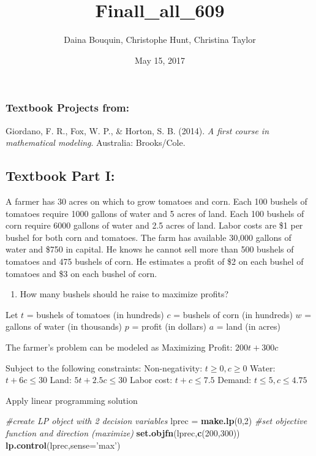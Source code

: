 \documentclass[]{article}
\title{Finall\_all\_609}
\author{Daina Bouquin, Christophe Hunt, Christina Taylor}
\date{May 15, 2017}
\newenvironment{Shaded}{\begin{snugshade}}{\end{snugshade}}
\newcommand{\KeywordTok}[1]{\textcolor[rgb]{0.13,0.29,0.53}{\textbf{#1}}}
\newcommand{\DataTypeTok}[1]{\textcolor[rgb]{0.13,0.29,0.53}{#1}}
\newcommand{\DecValTok}[1]{\textcolor[rgb]{0.00,0.00,0.81}{#1}}
\newcommand{\StringTok}[1]{\textcolor[rgb]{0.31,0.60,0.02}{#1}}
\newcommand{\CommentTok}[1]{\textcolor[rgb]{0.56,0.35,0.01}{\textit{#1}}}
\newcommand{\NormalTok}[1]{#1}
\providecommand{\tightlist}{%
  \setlength{\itemsep}{0pt}\setlength{\parskip}{0pt}}
\begin{document}
\maketitle

{
\setcounter{tocdepth}{2}
\tableofcontents
}
\subsubsection{Textbook Projects from:}\label{textbook-projects-from}

Giordano, F. R., Fox, W. P., \& Horton, S. B. (2014). \emph{A first
course in mathematical modeling}. Australia: Brooks/Cole.

\subsection{Textbook Part I:}\label{textbook-part-i}

A farmer has 30 acres on which to grow tomatoes and corn. Each 100
bushels of tomatoes require 1000 gallons of water and 5 acres of land.
Each 100 bushels of corn require 6000 gallons of water and 2.5 acres of
land. Labor costs are \$1 per bushel for both corn and tomatoes. The
farm has available 30,000 gallons of water and \$750 in capital. He
knows he cannot sell more than 500 bushels of tomatoes and 475 bushels
of corn. He estimates a profit of \$2 on each bushel of tomatoes and \$3
on each bushel of corn.

\begin{enumerate}
\def\labelenumi{(\alph{enumi})}
\tightlist
\item
  How many bushels should he raise to maximize profits?
\end{enumerate}

Let \(t\) = bushels of tomatoes (in hundreds) \(c\) = bushels of corn
(in hundreds) \(w\) = gallons of water (in thousands) \(p\) = profit (in
dollars) \(a\) = land (in acres)

The farmer's problem can be modeled as Maximizing Profit:
\(200t + 300c\)

Subject to the following constraints: Non-negativity:
\(t \geq 0, c \geq 0\) Water: \(t + 6c \leq 30\) Land:
\(5t + 2.5c \leq 30\) Labor cost: \(t + c \leq 7.5\) Demand:
\(t \leq 5, c \leq 4.75\)

Apply linear programming solution

\begin{Shaded}
\begin{Highlighting}[]
\CommentTok{#create LP object with 2 decision variables}
\NormalTok{lprec =}\StringTok{ }\KeywordTok{make.lp}\NormalTok{(}\DecValTok{0}\NormalTok{,}\DecValTok{2}\NormalTok{)}
\CommentTok{#set objective function and direction (maximize)}
\KeywordTok{set.objfn}\NormalTok{(lprec,}\KeywordTok{c}\NormalTok{(}\DecValTok{200}\NormalTok{,}\DecValTok{300}\NormalTok{))}
\KeywordTok{lp.control}\NormalTok{(lprec,}\DataTypeTok{sense=}\StringTok{'max'}\NormalTok{)}
\end{Highlighting}
\end{Shaded}
\end{document}
